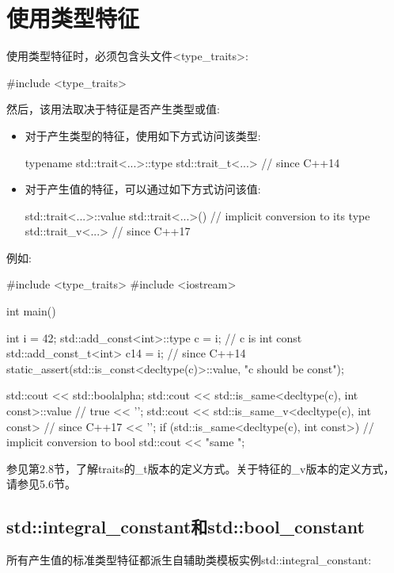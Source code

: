 \section{使用类型特征}

使用类型特征时，必须包含头文件<type\_traits>:

\begin{cpp}
#include <type_traits>
\end{cpp}

然后，该用法取决于特征是否产生类型或值:

\begin{itemize}
\item 
对于产生类型的特征，使用如下方式访问该类型:
\begin{cpp}
typename std::trait<...>::type
std::trait_t<...> // since C++14
\end{cpp}

\item 
对于产生值的特征，可以通过如下方式访问该值:
\begin{cpp}
std::trait<...>::value
std::trait<...>() // implicit conversion to its type
std::trait_v<...> // since C++17
\end{cpp}
\end{itemize}

例如:

\begin{cpp}
#include <type_traits>
#include <iostream>

int main()
{
	int i = 42;
	std::add_const<int>::type c = i; // c is int const
	std::add_const_t<int> c14 = i; // since C++14
	static_assert(std::is_const<decltype(c)>::value, "c should be const");
	
	std::cout << std::boolalpha;
	std::cout << std::is_same<decltype(c), int const>::value // true
			<< ’\n’;
	std::cout << std::is_same_v<decltype(c), int const> // since C++17
			<< ’\n’;
	if (std::is_same<decltype(c), int const>{}) { // implicit conversion to bool
		std::cout << "same \n";
	}
}
\end{cpp}

参见第2.8节，了解traits的\_t版本的定义方式。关于特征的\_v版本的定义方式，请参见5.6节。

\subsection{std::integral\_constant和std::bool\_constant}

所有产生值的标准类型特征都派生自辅助类模板实例std::integral\_constant:


